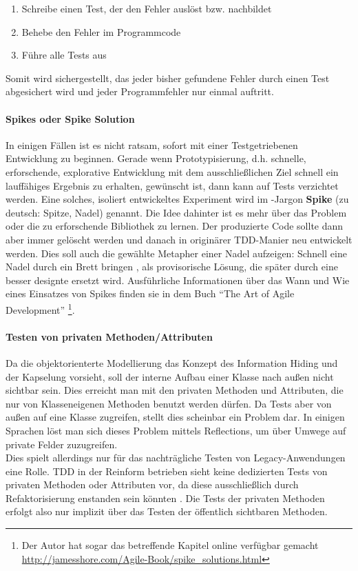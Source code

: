   \begin{enumerate}
   \item Schreibe einen Test, der den Fehler auslöst bzw. nachbildet
   \item Behebe den Fehler im Programmcode
   \item Führe alle Tests aus
  \end{enumerate}
  Somit wird sichergestellt, das jeder bisher gefundene Fehler durch einen Test abgesichert wird und jeder Programmfehler nur einmal auftritt.
  \paragraph{Spikes oder Spike Solution} In einigen Fällen ist es nicht ratsam, sofort mit einer Testgetriebenen Entwicklung zu beginnen. Gerade wenn Prototypisierung, d.h. schnelle, erforschende, explorative Entwicklung mit dem ausschließlichen Ziel schnell ein lauffähiges Ergebnis zu erhalten, gewünscht ist, dann kann auf Tests verzichtet werden. Eine solches, isoliert entwickeltes Experiment wird im -Jargon \textbf{Spike} (zu deutsch: Spitze, Nadel) genannt. Die Idee dahinter ist es mehr über das Problem oder die zu erforschende Bibliothek zu lernen. Der produzierte Code sollte dann aber immer gelöscht werden und danach in originärer TDD-Manier neu entwickelt werden. Dies soll auch die gewählte Metapher einer Nadel aufzeigen: Schnell eine Nadel durch ein Brett bringen \citep{shore_art_2007}, als provisorische Lösung, die später durch eine besser designte ersetzt wird. Ausführliche Informationen über das Wann und Wie eines Einsatzes von Spikes finden sie in dem Buch "`The Art of Agile Development"' \citep{shore_art_2007}\footnote{Der Autor hat sogar das betreffende Kapitel online verfügbar gemacht \url{http://jamesshore.com/Agile-Book/spike_solutions.html}}.

  \paragraph{Testen von privaten Methoden/Attributen} Da die objektorienterte Modellierung das Konzept des Information Hiding und der Kapselung vorsieht, soll der interne Aufbau einer Klasse nach außen nicht sichtbar sein. Dies erreicht man mit den privaten Methoden und Attributen, die nur von Klasseneigenen Methoden benutzt werden dürfen. Da Tests aber von außen auf eine Klasse zugreifen, stellt dies scheinbar ein Problem dar. In einigen Sprachen löst man sich dieses Problem mittels Reflections, um über Umwege auf private Felder zuzugreifen. \\
  Dies spielt allerdings nur für das nachträgliche Testen von Legacy-Anwendungen eine Rolle. TDD in der Reinform betrieben sieht keine dedizierten Tests von privaten Methoden oder Attributen vor, da diese ausschließlich durch Refaktorisierung enstanden sein könnten \citep{caroli_agile_2008}. Die Tests der privaten Methoden erfolgt also nur implizit über das Testen der öffentlich sichtbaren Methoden.


